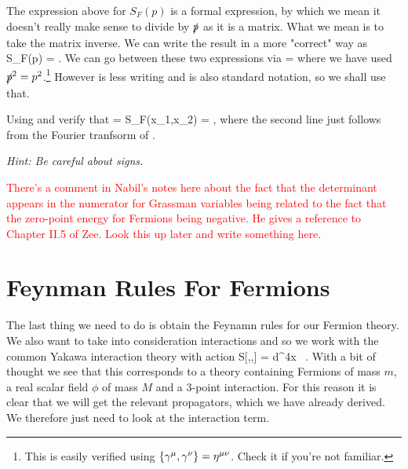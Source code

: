 \br 
    The expression above for $S_F(p)$ is a formal expression, by which we mean it doesn't really make sense to divide by $\slashed{p}$ as it is a matrix. What we mean is to take the matrix inverse. We can write the result in a more "correct" way as
    \bse 
        S_F(p) = .
    \ese 
    We can go between these two expressions via 
    \bse 
         = 
    \ese 
    where we have used $\slashed{p}^2=p^2$.\footnote{This is easily verified using $\{\gamma^{\mu},\gamma^{\nu}\} = \eta^{\mu\nu}$. Check it if you're not familiar.} However  is less writing and is also standard notation, so we shall use that. 
\er 

\bbox 
    Using  and  verify that 
    \bse 
         = S_F(x_1,x_2) = \int {} ,
    \ese 
    where the second line just follows from the Fourier tranfsorm of .
    
    \textit{Hint: Be careful about signs.}
\ebox 

\br 
    \textcolor{red}{There's a comment in Nabil's notes here about the fact that the determinant appears in the numerator for Grassman variables being related to the fact that the zero-point energy for Fermions being negative. He gives a reference to Chapter II.5 of Zee. Look this up later and write something here.}
\er 

\section{Feynman Rules For Fermions}

The last thing we need to do is obtain the Feynamn rules for our Fermion theory. We also want to take into consideration interactions and so we work with the common Yakawa interaction theory with action 
\bse 
    S[\psi,\overline{\psi},\phi] = \int d^4x \, .
\ese 
With a bit of thought we see that this corresponds to a theory containing Fermions of mass $m$, a real scalar field $\phi$ of mass $M$ and a $3$-point interaction. For this reason it is clear that we will get the relevant propagators, which we have already derived. We therefore just need to look at the interaction term. 

